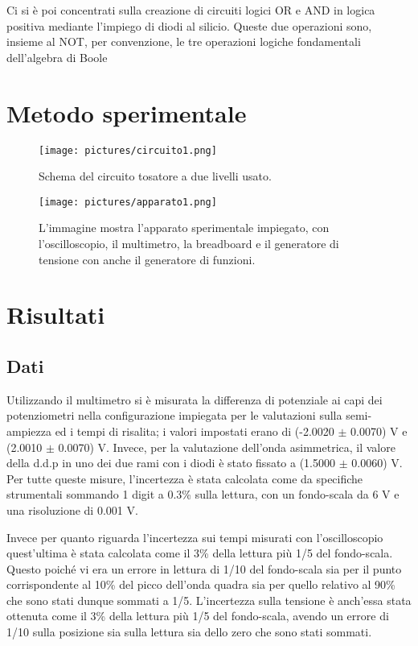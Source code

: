 \documentclass[a4paper,11pt]{article}
\begin{document}
	Ci si è poi concentrati sulla creazione di circuiti logici OR e AND in logica positiva mediante l'impiego di diodi al silicio. Queste due operazioni sono, insieme al NOT, per convenzione, le tre operazioni logiche fondamentali dell'algebra di Boole 
	
	\section{Metodo sperimentale}
	
	
	\begin{figure}
		\centering
		\texttt{[image: pictures/circuito1.png]}
		\caption{Schema del circuito tosatore a due livelli usato.}
		\label{fig:circuito}
	\end{figure}
	
	\begin{figure}
		\centering
		\texttt{[image: pictures/apparato1.png]}
		\caption{L'immagine mostra l'apparato sperimentale impiegato, con l'oscilloscopio, il multimetro, la breadboard e il generatore di tensione con anche il generatore di funzioni. }
		\label{fig:apparato}
	\end{figure}
	
	\FloatBarrier
	\section{Risultati}
	
	
	
	\subsection{Dati}
	Utilizzando il multimetro si è misurata la differenza di potenziale ai capi dei potenziometri nella configurazione impiegata per le valutazioni sulla semi-ampiezza ed i tempi di risalita; i valori impostati erano di (-2.0020 $\pm$ 0.0070) V e (2.0010 $\pm$ 0.0070) V. Invece, per la valutazione dell'onda asimmetrica, il valore della d.d.p in uno dei due rami con i diodi è stato fissato a (1.5000 $\pm$ 0.0060) V. Per tutte queste misure, l'incertezza è stata calcolata come da specifiche strumentali sommando 1 digit a 0.3\% sulla lettura, con un fondo-scala da 6 V e una risoluzione di 0.001 V. 
	
	Invece per quanto riguarda l'incertezza sui tempi misurati con l'oscilloscopio quest'ultima è stata calcolata come il 3\% della lettura più 1/5 del fondo-scala. Questo poiché vi era un errore in lettura di 1/10 del fondo-scala sia per il punto corrispondente al 10\% del picco dell'onda quadra sia per quello relativo al 90\% che sono stati dunque sommati a 1/5.  L'incertezza sulla tensione è anch'essa stata ottenuta come il 3\% della lettura più 1/5 del fondo-scala, avendo un errore di 1/10 sulla posizione sia sulla lettura sia dello zero che sono stati sommati.
	
\end{document}

